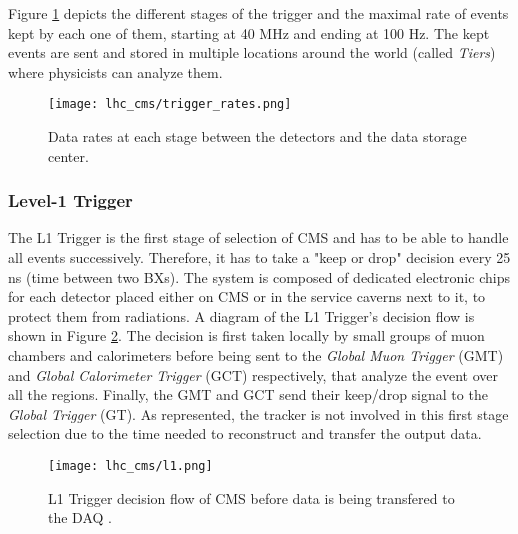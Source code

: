             Figure \ref{fig:trigger_system_and_reconstruction_algorithms__rates} depicts the different stages of the trigger and the maximal rate of events kept by each one of them, starting at 40 MHz and ending at 100 Hz. The kept events are sent and stored in multiple locations around the world (called \emph{Tiers}) where physicists can analyze them.

            \begin{figure}[h!]
                \centering
                \texttt{[image: lhc\_cms/trigger\_rates.png]}
                \caption{Data rates at each stage between the detectors and the data storage center. \Cite{CMS_Trigger_System}}
                \label{fig:trigger_system_and_reconstruction_algorithms__rates}
            \end{figure}    

            \subsubsection{Level-1 Trigger}

                The L1 Trigger is the first stage of selection of CMS and has to be able to handle all events successively. Therefore, it has to take a "keep or drop" decision every 25 ns (time between two BXs). The system is composed of dedicated electronic chips for each detector placed either on CMS or in the service caverns next to it, to protect them from radiations. A diagram of the L1 Trigger's decision flow is shown in Figure \ref{fig:trigger_system_and_reconstruction_algorithms__l1}. The decision is first taken locally by small groups of muon chambers and calorimeters before being sent to the \emph{Global Muon Trigger} (GMT) \Cite{Trigger_Muon} and \emph{Global Calorimeter Trigger} (GCT) respectively, that analyze the event over all the regions. Finally, the GMT and GCT send their keep/drop signal to the \emph{Global Trigger} (GT). As represented, the tracker is not involved in this first stage selection due to the time needed to reconstruct and transfer the output data. \\

                \begin{figure}[h!]
                    \centering
                    \texttt{[image: lhc\_cms/l1.png]}
                    \caption{L1 Trigger decision flow of CMS before data is being transfered to the DAQ \Cite{CMS_at_LHC}.}
                    \label{fig:trigger_system_and_reconstruction_algorithms__l1}
                \end{figure}

